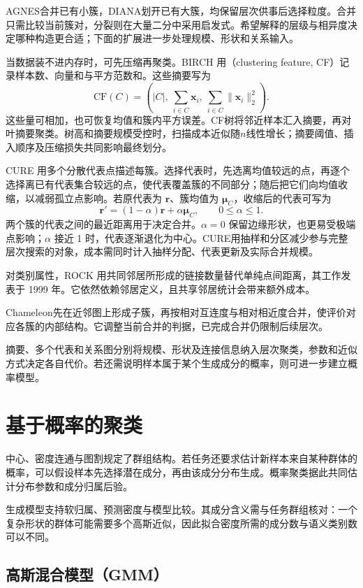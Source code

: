 AGNES合并已有小簇，DIANA划开已有大簇，均保留层次供事后选择粒度。合并只需比较当前簇对，分裂则在大量二分中采用启发式。希望解释的层级与相异度决定哪种构造更合适；下面的扩展进一步处理规模、形状和关系输入。

当数据装不进内存时，可先压缩再聚类。BIRCH 用（clustering feature, CF）记录样本数、向量和与平方范数和。这些摘要写为
\[
 \mathrm{CF}(C)=
 \left(|C|,\ \sum_{i\in C}\bm{x}_i,\
 \sum_{i\in C}\lVert\bm{x}_i\rVert_2^2\right).
\]
这些量可相加，也可恢复均值和簇内平方误差。CF树将邻近样本汇入摘要，再对叶摘要聚类。树高和摘要规模受控时，扫描成本近似随$n$线性增长；摘要阈值、插入顺序及压缩损失共同影响最终划分。

CURE 用多个分散代表点描述每簇。选择代表时，先选离均值较远的点，再逐个选择离已有代表集合较远的点，使代表覆盖簇的不同部分；随后把它们向均值收缩，以减弱孤立点影响。若原代表为 $\bm{r}$、簇均值为 $\bm{\mu}_C$，收缩后的代表可写为
\[
 \bm{r}'=(1-\alpha)\bm{r}+\alpha\bm{\mu}_C,
 \qquad 0\leq\alpha\leq1.
\]
两个簇的代表之间的最近距离用于决定合并。$\alpha=0$ 保留边缘形状，也更易受极端点影响；$\alpha$ 接近 1 时，代表逐渐退化为中心。CURE用抽样和分区减少参与完整层次搜索的对象，成本需同时计入抽样分配、代表更新及实际合并规模。

对类别属性，ROCK 用共同邻居所形成的链接数量替代单纯点间距离，其工作发表于 1999 年。它依然依赖邻居定义，且共享邻居统计会带来额外成本。

\Needspace{55mm}
Chameleon先在近邻图上形成子簇，再按相对互连度与相对相近度合并，使评价对应各簇的内部结构。它调整当前合并的判据，已完成合并仍限制后续层次。

摘要、多个代表和关系图分别将规模、形状及连接信息纳入层次聚类，参数和近似方式决定各自代价。若还需说明样本属于某个生成成分的概率，则可进一步建立概率模型。

\section{基于概率的聚类}
\label{sec:clustering-probabilistic}

中心、密度连通与图割规定了群组结构。若任务还要求估计新样本来自某种群体的概率，可以假设样本先选择潜在成分，再由该成分分布生成。概率聚类据此共同估计分布参数和成分归属后验。

生成模型支持软归属、预测密度与模型比较。其成分含义需与任务群组核对：一个复杂形状的群体可能需要多个高斯近似，因此拟合密度所需的成分数与语义类别数可以不同。

\subsection{高斯混合模型（GMM）}
\label{sec:clustering-gmm}

